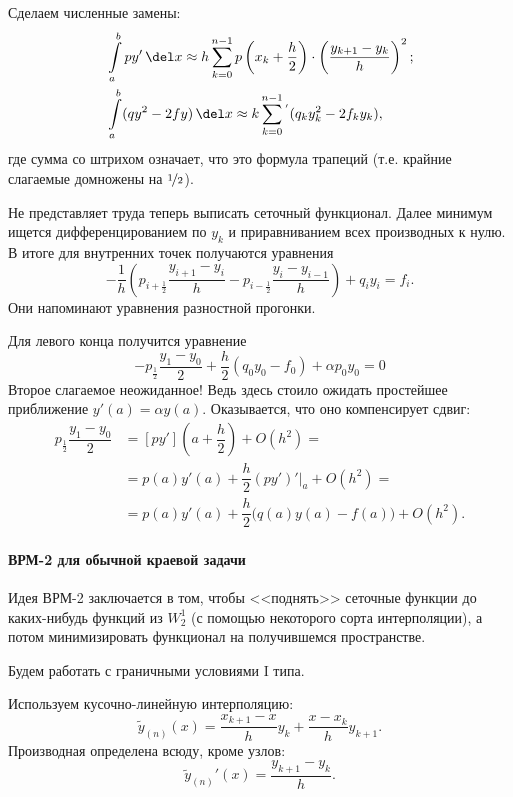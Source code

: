 \documentclass{trlnotes}
\begin{document}
    Сделаем численные замены:
    \begin{align*}
        &\int\limits_a^b py' \, \del x \approx h \sum\limits_{k = 0}^{n - 1} p\left(x_k + \dfrac{h}{2} \right) \cdot \left(\dfrac{y_{k + 1} - y_k}{h}\right)^2; \\ 
        &\int\limits_a^b (qy^2 - 2fy) \, \del x \approx k\sum\limits_{k = 0}^{n - 1}\,\!^{'} (q_ky_k^2 - 2f_ky_k),
    \end{align*}
    где сумма со штрихом означает, что это формула трапеций (т.е. крайние слагаемые домножены на $\nicefrac{1}{2}$).

    Не представляет труда теперь выписать сеточный функционал. Далее минимум ищется дифференцированием по $y_k$ и приравниванием всех производных к нулю. В итоге для внутренних точек получаются уравнения
    \[
        -\dfrac{1}{h}\left(p_{i + \tfrac{1}{2}} \dfrac{y_{i + 1} - y_i}{h} - p_{i - \tfrac{1}{2}} \dfrac{y_i - y_{i - 1}}{h}\right) + q_i y_i = f_i.
    \]
    Они напоминают уравнения разностной прогонки.

    Для левого конца получится уравнение
    \[
        -p_{\frac{1}{2}} \dfrac{y_1 - y_0}{2} + \dfrac{h}{2}(q_0 y_0 - f_0) + \alpha p_0 y_0 = 0
    \]
    Второе слагаемое неожиданное! Ведь здесь стоило ожидать простейшее приближение $y'(a) = \alpha y(a)$. Оказывается, что оно компенсирует сдвиг:
    \begin{align*}
        p_{\frac{1}{2}} \dfrac{y_1 - y_0}{2} &= [py']\left(a + \dfrac{h}{2}\right) + O(h^2)  = \\ &= p(a)y'(a) + \dfrac{h}{2}(py')'|_a + O(h^2) = \\ &= p(a)y'(a) + \dfrac{h}{2} \big(q(a)y(a) - f(a)\big) + O(h^2). 
    \end{align*}

    \paragraph{ВРМ-2 для обычной краевой задачи}

    Идея ВРМ-2 заключается в том, чтобы <<поднять>> сеточные функции до каких-нибудь функций из $W_2^1$  (с помощью некоторого сорта интерполяции), а потом минимизировать функционал на получившемся пространстве. 

    Будем работать с граничными условиями I типа.

    Используем кусочно-линейную интерполяцию:
    \[
        \tilde{y}_{(n)}(x) = \dfrac{x_{k + 1} - x}{h} y_k + \dfrac{x - x_k}{h}y_{k + 1}.
    \]
    Производная определена всюду, кроме узлов:
    \[
        \tilde{y}_{(n)}'(x) = \dfrac{y_{k + 1} - y_k}{h}.
    \]
\end{document}

